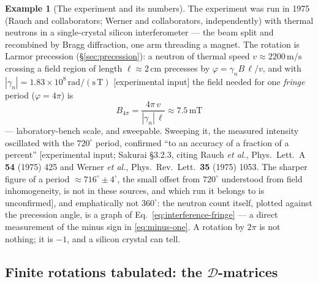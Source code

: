 \documentclass[11pt]{article}
\theoremstyle{plain}
\theoremstyle{definition}
\newtheorem{example}[theorem]{Example}
\theoremstyle{remark}
\begin{document}
\begin{example}[The experiment and its numbers]
\label{ex:neutron-interferometry}
The experiment was run in 1975 (Rauch and collaborators; Werner and
collaborators, independently) with thermal neutrons in a
single-crystal silicon interferometer --- the beam split and
recombined by Bragg diffraction, one arm threading a magnet. The
rotation is Larmor precession (\S\ref{sec:precession}): a neutron
of thermal speed $v \approx 2200\,\mathrm{m/s}$ crossing a field
region of length $\ell \approx 2\,\mathrm{cm}$ precesses by
$\varphi = \gamma_n B\,\ell/v$, and with
$|\gamma_n| = 1.83\times10^{8}\,\mathrm{rad/(s\,T)}$ [experimental
input] the field
needed for one \emph{fringe} period ($\varphi = 4\pi$) is
\begin{equation}
  B_{4\pi}
  = \frac{4\pi\, v}{|\gamma_n|\,\ell}
  \approx 7.5\,\mathrm{mT}
\end{equation}
--- laboratory-bench scale, and sweepable. Sweeping it, the
measured intensity oscillated with the $720^\circ$ period, confirmed
``to an accuracy of a fraction of a percent'' [experimental input;
Sakurai \S3.2.3, citing Rauch \emph{et al.}, Phys.\ Lett.\ A
\textbf{54} (1975) 425 and Werner \emph{et al.}, Phys.\ Rev.\ Lett.\
\textbf{35} (1975) 1053. The sharper figure of a period
$\approx 716^\circ \pm 4^\circ$, the small offset from $720^\circ$
understood from field inhomogeneity, is not in these sources, and
which run it belongs to is unconfirmed], and emphatically not
$360^\circ$: the neutron
count itself, plotted against the precession angle, is a graph of
Eq.~\eqref{eq:interference-fringe} --- a direct measurement of the
minus sign in \eqref{eq:minus-one}. A rotation by $2\pi$ is
not nothing; it is $-1$, and a silicon crystal can tell.
\end{example}

\subsection{Finite rotations tabulated: the $\mathscr D$-matrices}
\label{sec:D-functions}
\end{document}
